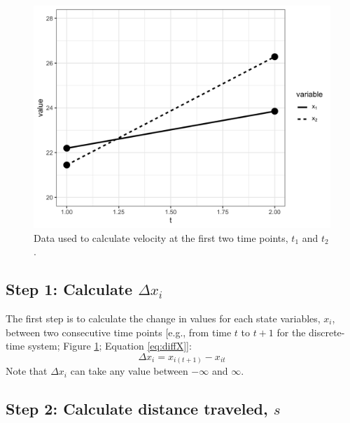 \documentclass[print]{nuthesis}
\begin{document}
\begin{figure}
\includegraphics[width=0.85\linewidth]{./chapterFiles/velocity/figsCalledInDiss/sysEx2} \caption{Data used to calculate velocity at the first two time points, $t_1$ and $t_2$.}\label{fig:sysEx2}
\end{figure}
\hypertarget{step-1-calculate-delta-x_i}{%
\subsection{\texorpdfstring{Step 1: Calculate \(\Delta x_i\)}{Step 1: Calculate \textbackslash Delta x\_i}}\label{step-1-calculate-delta-x_i}}

The first step is to calculate the change in values for each state variables, \(x_i\), between two consecutive time points {[}e.g., from time \(t\) to \(t+1\) for the discrete-time system; Figure \ref{fig:sysEx2}; Equation \eqref{eq:diffX}{]}:
\begin{equation}
\Delta x_i = x_{i(t+1)} - x_{it} 
\label{eq:diffX}
\end{equation}
Note that \(\Delta x_i\) can take any value between \(-\infty\) and \(\infty\).

\hypertarget{step-2-calculate-distance-traveled-s}{%
\subsection{\texorpdfstring{Step 2: Calculate distance traveled, \(s\)}{Step 2: Calculate distance traveled, s}}\label{step-2-calculate-distance-traveled-s}}
\end{document}
